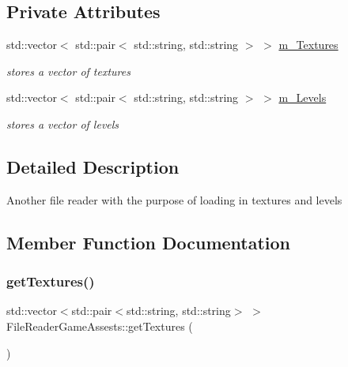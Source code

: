 \subsection*{Private Attributes}
\begin{DoxyCompactItemize}
\item 
\mbox{\label{class_file_reader_game_assests_a4be62add5fcf98f1bd551e8d4c8ab34c}} 
std\+::vector$<$ std\+::pair$<$ std\+::string, std\+::string $>$ $>$ \mbox{\hyperlink{class_file_reader_game_assests_a4be62add5fcf98f1bd551e8d4c8ab34c}{m\+\_\+\+Textures}}
\begin{DoxyCompactList}\small\item\em stores a vector of textures \end{DoxyCompactList}\item 
\mbox{\label{class_file_reader_game_assests_ab160d574a819bfe608fef64fc20b6bad}} 
std\+::vector$<$ std\+::pair$<$ std\+::string, std\+::string $>$ $>$ \mbox{\hyperlink{class_file_reader_game_assests_ab160d574a819bfe608fef64fc20b6bad}{m\+\_\+\+Levels}}
\begin{DoxyCompactList}\small\item\em stores a vector of levels \end{DoxyCompactList}\end{DoxyCompactItemize}


\subsection{Detailed Description}
Another file reader with the purpose of loading in textures and levels 

\subsection{Member Function Documentation}
\mbox{\label{class_file_reader_game_assests_a952fd5fb0c4d71319af28483ef60ad84}} 
\subsubsection{\texorpdfstring{get\+Textures()}{getTextures()}}
{\footnotesize\ttfamily std\+::vector$<$std\+::pair$<$std\+::string, std\+::string$>$ $>$ File\+Reader\+Game\+Assests\+::get\+Textures (\begin{DoxyParamCaption}{ }\end{DoxyParamCaption})}



